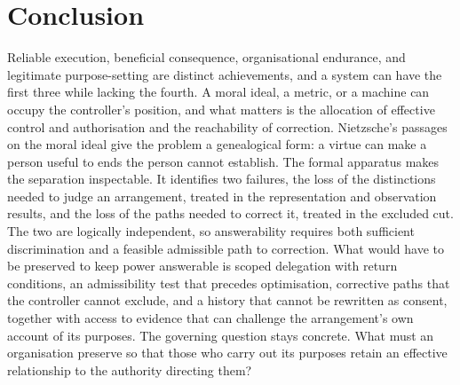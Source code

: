 \documentclass[11pt]{article}
\theoremstyle{definition}
\theoremstyle{remark}
\begin{document}
\section{Conclusion}

Reliable execution, beneficial consequence, organisational endurance, and legitimate purpose-setting are distinct achievements, and a system can have the first three while lacking the fourth. A moral ideal, a metric, or a machine can occupy the controller's position, and what matters is the allocation of effective control and authorisation and the reachability of correction. Nietzsche's passages on the moral ideal give the problem a genealogical form: a virtue can make a person useful to ends the person cannot establish. The formal apparatus makes the separation inspectable. It identifies two failures, the loss of the distinctions needed to judge an arrangement, treated in the representation and observation results, and the loss of the paths needed to correct it, treated in the excluded cut. The two are logically independent, so answerability requires both sufficient discrimination and a feasible admissible path to correction. What would have to be preserved to keep power answerable is scoped delegation with return conditions, an admissibility test that precedes optimisation, corrective paths that the controller cannot exclude, and a history that cannot be rewritten as consent, together with access to evidence that can challenge the arrangement's own account of its purposes. The governing question stays concrete. What must an organisation preserve so that those who carry out its purposes retain an effective relationship to the authority directing them?
\end{document}
